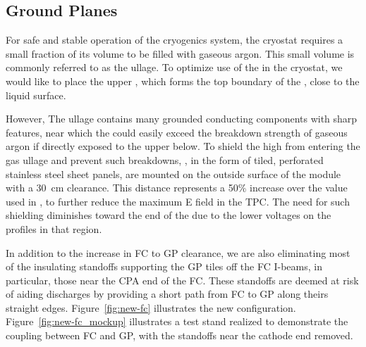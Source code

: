 


\subsection{Ground Planes}
\label{sec:fdsp-hv-des-fc-gp}

For safe and stable operation of the \lar cryogenics system, the cryostat requires a small fraction of its volume to be filled with gaseous argon. This small volume is commonly referred to as the ullage. To optimize use of the \lar in the cryostat, we would like to place the upper , which forms the top boundary of the , close to the liquid surface.

However, The ullage contains many grounded %
conducting components with sharp features, near which the \efield could easily exceed the breakdown strength of gaseous argon if directly exposed to the upper  below. To shield the high \efield from entering the gas ullage and prevent such breakdowns, %
, %
in the form of tiled, perforated stainless steel sheet panels, are mounted on the outside surface of the 
 module with a \SI{30}{\cm} clearance.  This distance represents a 50\% increase over the value used in , to further reduce the maximum E field in the TPC. 
The need for such shielding diminishes toward the  end of the  due to the lower voltages on the  profiles in that region. %

In addition to the increase in FC to GP clearance, we are also eliminating most of the insulating standoffs supporting the GP tiles off the FC I-beams, in particular, those near the CPA end of the FC.  These standoffs  are deemed at risk of aiding discharges by providing a short path from FC to GP along theirs straight edges.  Figure~\ref{fig:new-fc} illustrates the new configuration. Figure~\ref{fig:new-fc_mockup} illustrates a test stand realized to demonstrate the coupling between FC and GP, with the standoffs near the cathode end removed. 



